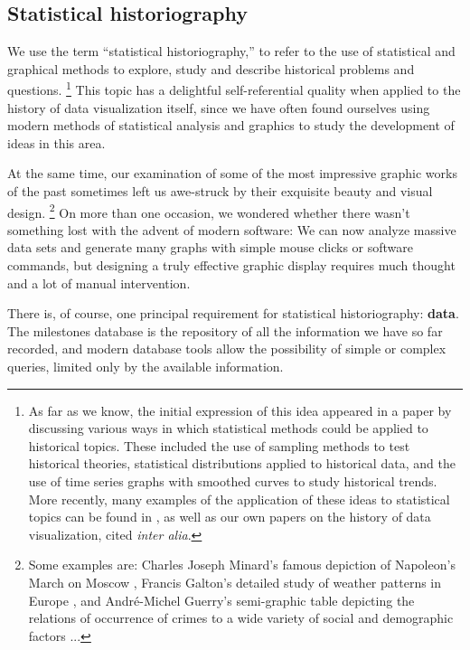\documentclass[11pt]{article}
\begin{document}
\subsection{Statistical historiography}\label{sec:stathist}
We use the term ``statistical historiography,''
to refer to the use of statistical and graphical methods to
explore, study and describe historical problems and questions.%
\footnote{As far as we know, the initial expression of this idea appeared in a paper by
\citet{Rubin:1943} discussing various ways in which statistical methods could be applied
to historical topics.  These included the use of sampling methods to test historical theories,
statistical distributions applied to historical data, and the use of
time series graphs with smoothed curves to study historical trends.
More recently, many examples of the application of these ideas to statistical topics
can be found in \citet{Stigler:1986,Stigler:1999}, as well as our own papers
on the history of data visualization,
cited \emph{inter alia}.
}
This topic has a delightful self-referential quality when applied to the history of data visualization itself,
since we have often found ourselves using modern methods of statistical analysis and graphics to study
the development of ideas in this area.

At the same time, our examination of some of the most
impressive graphic works of the past sometimes left us awe-struck by their exquisite
beauty and visual design.%
\footnote{ Some examples are:
Charles Joseph Minard's famous depiction of Napoleon's March on Moscow \citep{Friendly:02:Minard},
Francis Galton's detailed study of weather patterns in Europe \citep[see:][]{Friendly:2008:golden},
and Andr{\'e}-Michel Guerry's \citep[Plate 17]{Guerry:1864}
semi-graphic table depicting the relations of occurrence of
crimes to a wide variety of social and demographic factors \citep[see:][]{Friendly:2007:guerry}
...
}
On more than one occasion, we wondered whether there wasn't something lost with the advent of modern
software: We can now analyze massive data sets and generate many graphs with simple mouse clicks
or software commands, but designing a truly effective graphic display requires much thought and
a lot of manual intervention.

There is, of course,  one principal requirement for statistical historiography: \textbf{data}.
The milestones database is the repository of all the information we have so far recorded,
and modern database tools allow the possibility of simple or complex queries, limited only
by the available information.
\end{document}
